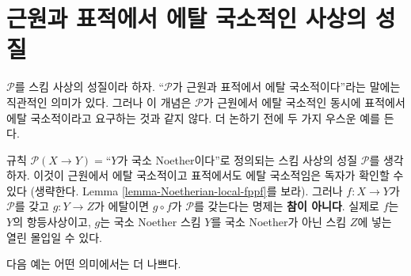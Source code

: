 \section{근원과 표적에서 에탈 국소적인 사상의 성질}
\label{section-properties-etale-local-source-target}

\noindent
$\mathcal{P}$를 스킴 사상의 성질이라 하자. ``$\mathcal{P}$가 근원과
표적에서 에탈 국소적이다''라는 말에는 직관적인 의미가 있다. 그러나
이 개념은 $\mathcal{P}$가 근원에서 에탈 국소적인 동시에 표적에서 에탈
국소적이라고 요구하는 것과 같지 않다. 더 논하기 전에 두 가지
우스운 예를 든다.

\begin{example}
\label{example-silly-one}
규칙 $\mathcal{P}(X \to Y) = $``$Y$가 국소 Noether이다''로 정의되는
스킴 사상의 성질 $\mathcal{P}$를 생각하자. 이것이 근원에서 에탈
국소적이고 표적에서도 에탈 국소적임은 독자가 확인할 수 있다
(생략한다. Lemma \ref{lemma-Noetherian-local-fppf}를 보라).
그러나 $f : X \to Y$가 $\mathcal{P}$를 갖고 $g : Y \to Z$가
에탈이면 $g \circ f$가 $\mathcal{P}$를 갖는다는 명제는 {\bf 참이
아니다}. 실제로 $f$는 $Y$의 항등사상이고, $g$는 국소 Noether 스킴
$Y$를 국소 Noether가 아닌 스킴 $Z$에 넣는 열린 몰입일 수 있다.
\end{example}

\noindent
다음 예는 어떤 의미에서는 더 나쁘다.

